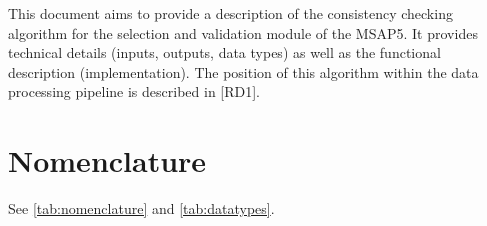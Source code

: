 \documentclass[a4paper, oneside, 11pt, article, english]{memoir}
\begin{document}
This document aims to provide a description of the consistency checking algorithm for the selection and validation module of the MSAP5. It
provides technical details (inputs, outputs, data types) as well as the
functional description (implementation). 
The position of this algorithm within
the data processing pipeline is described in [RD1]. 


\section{Nomenclature}
\label{sec:nomenclature}


See \ref{tab:nomenclature} and \ref{tab:datatypes}.
\end{document}
